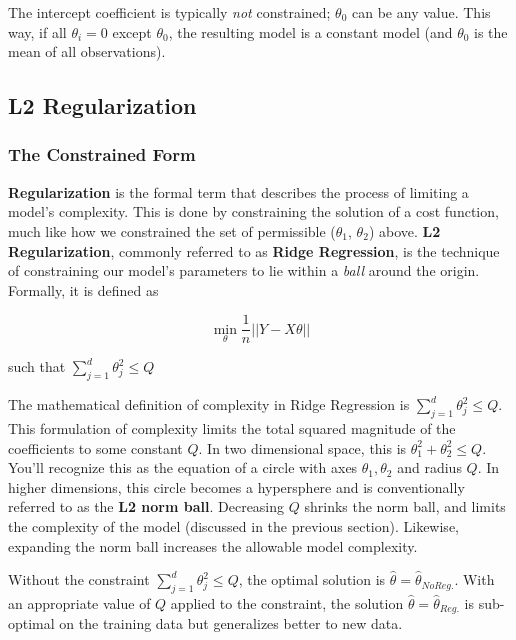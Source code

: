 \documentclass[
  letterpaper,
  DIV=11,
  numbers=noendperiod]{scrreprt}
\begin{document}
The intercept coefficient is typically \emph{not} constrained;
\(\theta_0\) can be any value. This way, if all \(\theta_i = 0\) except
\(\theta_0\), the resulting model is a constant model (and \(\theta_0\)
is the mean of all observations).

\hypertarget{l2-regularization}{%
\subsection{L2 Regularization}\label{l2-regularization}}

\hypertarget{the-constrained-form}{%
\subsubsection{The Constrained Form}\label{the-constrained-form}}

\textbf{Regularization} is the formal term that describes the process of
limiting a model's complexity. This is done by constraining the solution
of a cost function, much like how we constrained the set of permissible
(\(\theta_1\), \(\theta_2\)) above. \textbf{L2 Regularization}, commonly
referred to as \textbf{Ridge Regression}, is the technique of
constraining our model's parameters to lie within a \emph{ball} around
the origin. Formally, it is defined as

\[\min_{\theta} \frac{1}{n} || Y - X\theta ||\]

such that \(\sum_{j=1}^{d} \theta_j^{2} \le Q\)

The mathematical definition of complexity in Ridge Regression is
\(\sum_{j=1}^{d} \theta_j^{2} \le Q\). This formulation of complexity
limits the total squared magnitude of the coefficients to some constant
\(Q\). In two dimensional space, this is
\(\theta_{1}^{2} + \theta_{2}^{2} \le Q\). You'll recognize this as the
equation of a circle with axes \(\theta_{1}, \theta_{2}\) and radius
\(Q\). In higher dimensions, this circle becomes a hypersphere and is
conventionally referred to as the \textbf{L2 norm ball}. Decreasing
\(Q\) shrinks the norm ball, and limits the complexity of the model
(discussed in the previous section). Likewise, expanding the norm ball
increases the allowable model complexity.

Without the constraint \(\sum_{j=1}^{d} \theta_j^{2} \le Q\), the
optimal solution is \(\hat{\theta} = \hat\theta_{No Reg.}\). With an
appropriate value of \(Q\) applied to the constraint, the solution
\(\hat{\theta} = \hat\theta_{Reg.}\) is sub-optimal on the training data
but generalizes better to new data.
\end{document}
